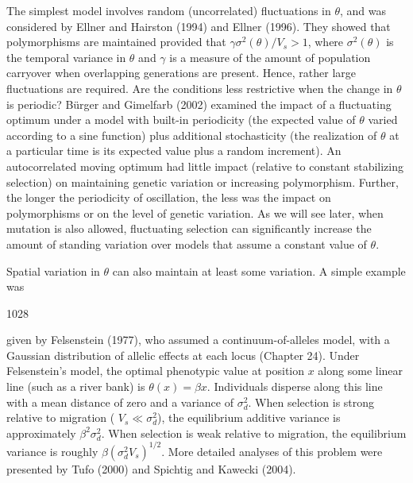 \documentclass{article}
\begin{document}
The simplest model involves random (uncorrelated) fluctuations in  $ \theta $, and was considered by Ellner and Hairston (1994) and Ellner (1996). They showed that polymorphisms are maintained provided that  $ \gamma\sigma^2(\theta)/V_s > 1 $, where  $ \sigma^2(\theta) $ is the temporal variance in  $ \theta $ and  $ \gamma $ is a measure of the amount of population carryover when overlapping generations are present. Hence, rather large fluctuations are required. Are the conditions less restrictive when the change in  $ \theta $ is periodic? Bürger and Gimelfarb (2002) examined the impact of a fluctuating optimum under a model with built-in periodicity (the expected value of  $ \theta $ varied according to a sine function) plus additional stochasticity (the realization of  $ \theta $ at a particular time is its expected value plus a random increment). An autocorrelated moving optimum had little impact (relative to constant stabilizing selection) on maintaining genetic variation or increasing polymorphism. Further, the longer the periodicity of oscillation, the less was the impact on polymorphisms or on the level of genetic variation. As we will see later, when mutation is also allowed, fluctuating selection can significantly increase the amount of standing variation over models that assume a constant value of  $ \theta $.

Spatial variation in  $ \theta $ can also maintain at least some variation. A simple example was

1028

given by Felsenstein (1977), who assumed a continuum-of-alleles model, with a Gaussian distribution of allelic effects at each locus (Chapter 24). Under Felsenstein’s model, the optimal phenotypic value at position  $ x $ along some linear line (such as a river bank) is  $ \theta(x) = \beta x $. Individuals disperse along this line with a mean distance of zero and a variance of  $ \sigma_d^2 $. When selection is strong relative to migration ( $ V_s \ll \sigma_d^2 $), the equilibrium additive variance is approximately  $ \beta^2 \sigma_d^2 $. When selection is weak relative to migration, the equilibrium variance is roughly  $ \beta (\sigma_d^2 V_s)^{1/2} $. More detailed analyses of this problem were presented by Tufo (2000) and Spichtig and Kawecki (2004).
\end{document}
